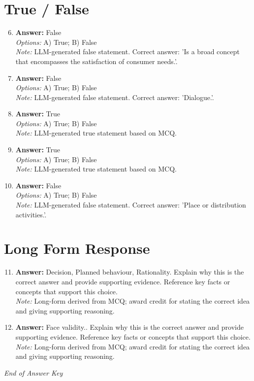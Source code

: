 \documentclass[12pt]{article}
\begin{document}
\section*{True / False}
\begin{enumerate}[label=\arabic*.]
\setcounter{enumi}{5}
\item \textbf{Answer:} False
\\ \textit{Options:} A) True; B) False
\\ \textit{Note:} LLM-generated false statement. Correct answer: 'Is a broad concept that encompasses the satisfaction of consumer needs.'.
\item \textbf{Answer:} False
\\ \textit{Options:} A) True; B) False
\\ \textit{Note:} LLM-generated false statement. Correct answer: 'Dialogue.'.
\item \textbf{Answer:} True
\\ \textit{Options:} A) True; B) False
\\ \textit{Note:} LLM-generated true statement based on MCQ.
\item \textbf{Answer:} True
\\ \textit{Options:} A) True; B) False
\\ \textit{Note:} LLM-generated true statement based on MCQ.
\item \textbf{Answer:} False
\\ \textit{Options:} A) True; B) False
\\ \textit{Note:} LLM-generated false statement. Correct answer: 'Place or distribution activities.'.
\end{enumerate}

\section*{Long Form Response}
\begin{enumerate}[label=\arabic*.]
\setcounter{enumi}{10}
\item \textbf{Answer:} Decision, Planned behaviour, Rationality. Explain why this is the correct answer and provide supporting evidence. Reference key facts or concepts that support this choice.
\\ \textit{Note:} Long-form derived from MCQ; award credit for stating the correct idea and giving supporting reasoning.
\item \textbf{Answer:} Face validity.. Explain why this is the correct answer and provide supporting evidence. Reference key facts or concepts that support this choice.
\\ \textit{Note:} Long-form derived from MCQ; award credit for stating the correct idea and giving supporting reasoning.
\end{enumerate}

\vfill
\noindent\textit{End of Answer Key}
\end{document}

